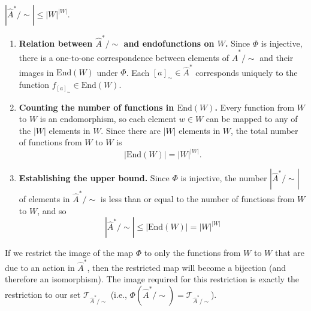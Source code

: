 \begin{propositionE}
    $|\hat{A}^{*}/\sim| \leq |W|^{|W|}$.
\end{propositionE}
\begin{proofE}
\begin{enumerate}
    \item \textbf{Relation between $\hat{A}^{*}/\sim$ and endofunctions on $W$.}
    Since $\Phi$ is injective, there is a one-to-one correspondence between elements of $\hat{A}^{*}/\sim$ and their images in $\text{End}(W)$ under $\Phi$.
    Each $[a]_{\sim} \in \hat{A}^{*}$ corresponds uniquely to the function $f_{[a]_{\sim}} \in \text{End}(W)$.

    \item \textbf{Counting the number of functions in $\text{End}(W)$.}
    Every function from $W$ to $W$ is an endomorphism, so each element $w \in W$ can be mapped to any of the $|W|$ elements in $W$.
    Since there are $|W|$ elements in $W$, the total number of functions from $W$ to $W$ is
    \begin{equation}
        |\text{End}(W)| = |W|^{|W|}.
    \end{equation}

    \item \textbf{Establishing the upper bound.}
    Since $\Phi$ is injective, the number $|\hat{A}^{*}/\sim|$ of elements in $\hat{A}^{*}/\sim$ is less than or equal to the number of functions from $W$ to $W$, and so
    \begin{equation}
        |\hat{A}^{*}/\sim| \leq |\text{End}(W)| = |W|^{|W|}
    \end{equation}
\end{enumerate}
\end{proofE}

If we restrict the image of the map $\Phi$ to only the functions from $W$ to $W$ that are due to an action in $\hat{A}^{*}$, then the restricted map will become a bijection (and therefore an isomorphism).
The image required for this restriction is exactly the restriction to our set $\mathcal{T}_{\hat{A}^{*}/\sim}$ (i.e., $\Phi(\hat{A}^{*}/\sim) = \mathcal{T}_{\hat{A}^{*}/\sim}$).

